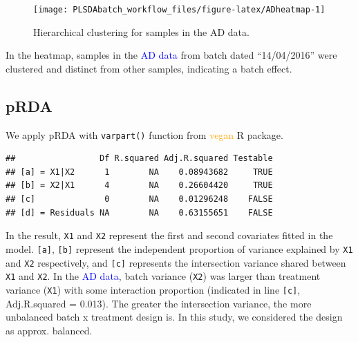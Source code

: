\documentclass[
]{book}
\newenvironment{Shaded}{\begin{snugshade}}{\end{snugshade}}
\newcommand{\AttributeTok}[1]{\textcolor[rgb]{0.77,0.63,0.00}{#1}}
\newcommand{\CommentTok}[1]{\textcolor[rgb]{0.56,0.35,0.01}{\textit{#1}}}
\newcommand{\ConstantTok}[1]{\textcolor[rgb]{0.00,0.00,0.00}{#1}}
\newcommand{\FunctionTok}[1]{\textcolor[rgb]{0.00,0.00,0.00}{#1}}
\newcommand{\NormalTok}[1]{#1}
\newcommand{\OtherTok}[1]{\textcolor[rgb]{0.56,0.35,0.01}{#1}}
\newcommand{\SpecialCharTok}[1]{\textcolor[rgb]{0.00,0.00,0.00}{#1}}
\newcommand{\StringTok}[1]{\textcolor[rgb]{0.31,0.60,0.02}{#1}}
\begin{document}
\begin{figure}

{\centering \texttt{[image: PLSDAbatch\_workflow\_files/figure-latex/ADheatmap-1]} 

}

\caption{Hierarchical clustering for samples in the AD data.}\label{fig:ADheatmap}
\end{figure}

In the heatmap, samples in the \textcolor{blue}{AD data} from batch dated ``14/04/2016'' were clustered and distinct from other samples, indicating a batch effect.

\hypertarget{prda}{%
\subsection{pRDA}\label{prda}}

We apply pRDA with \texttt{varpart()} function from \textcolor{orange}{vegan} R package.

\begin{Shaded}
\end{Shaded}

\begin{verbatim}
##                 Df R.squared Adj.R.squared Testable
## [a] = X1|X2      1        NA    0.08943682     TRUE
## [b] = X2|X1      4        NA    0.26604420     TRUE
## [c]              0        NA    0.01296248    FALSE
## [d] = Residuals NA        NA    0.63155651    FALSE
\end{verbatim}

In the result, \texttt{X1} and \texttt{X2} represent the first and second covariates fitted in the model. \texttt{{[}a{]}}, \texttt{{[}b{]}} represent the independent proportion of variance explained by \texttt{X1} and \texttt{X2} respectively, and \texttt{{[}c{]}} represents the intersection variance shared between \texttt{X1} and \texttt{X2}. In the \textcolor{blue}{AD data}, batch variance (\texttt{X2}) was larger than treatment variance (\texttt{X1}) with some interaction proportion (indicated in line \texttt{{[}c{]}}, Adj.R.squared = 0.013). The greater the intersection variance, the more unbalanced batch x treatment design is. In this study, we considered the design as approx. balanced.
\end{document}
